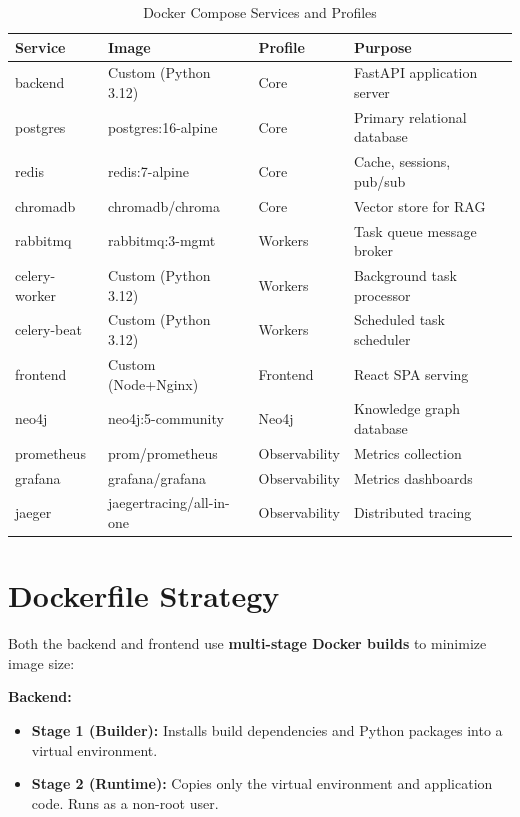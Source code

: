\documentclass[12pt, a4paper]{report}
\begin{document}
\begin{table}[H]
\centering
\caption{Docker Compose Services and Profiles}
\label{tab:docker}
\footnotesize
\begin{tabular}{p{2.2cm}|p{3.5cm}|p{2.2cm}|p{4.8cm}}
\toprule
\textbf{Service} & \textbf{Image} & \textbf{Profile} & \textbf{Purpose} \\
\midrule
backend      & Custom (Python 3.12)      & Core    & FastAPI application server \\
postgres     & postgres:16-alpine        & Core    & Primary relational database \\
redis        & redis:7-alpine            & Core    & Cache, sessions, pub/sub \\
chromadb     & chromadb/chroma           & Core    & Vector store for RAG \\
rabbitmq     & rabbitmq:3-mgmt           & Workers & Task queue message broker \\
celery-worker & Custom (Python 3.12)     & Workers & Background task processor \\
celery-beat  & Custom (Python 3.12)      & Workers & Scheduled task scheduler \\
frontend     & Custom (Node+Nginx)       & Frontend & React SPA serving \\
neo4j        & neo4j:5-community         & Neo4j   & Knowledge graph database \\
prometheus   & prom/prometheus           & Observability & Metrics collection \\
grafana      & grafana/grafana           & Observability & Metrics dashboards \\
jaeger       & jaegertracing/all-in-one  & Observability & Distributed tracing \\
\bottomrule
\end{tabular}
\end{table}
\normalsize

\section{Dockerfile Strategy}

Both the backend and frontend use \textbf{multi-stage Docker builds} to minimize image size:

\textbf{Backend:}
\begin{itemize}
    \item \textbf{Stage 1 (Builder):} Installs build dependencies and Python packages into a virtual environment.
    \item \textbf{Stage 2 (Runtime):} Copies only the virtual environment and application code. Runs as a non-root user.
\end{itemize}
\end{document}
